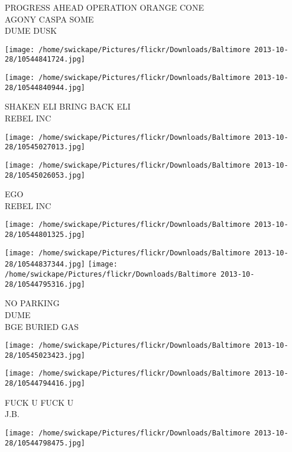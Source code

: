 \documentclass[10pt,letterpaper]{article}
\begin{document}
PROGRESS AHEAD OPERATION ORANGE CONE\\
AGONY CASPA SOME\\
DUME DUSK\\
\pagebreak

\texttt{[image: /home/swickape/Pictures/flickr/Downloads/Baltimore 2013-10-28/10544841724.jpg]}

\vspace{0.25in}
\texttt{[image: /home/swickape/Pictures/flickr/Downloads/Baltimore 2013-10-28/10544840944.jpg]}

SHAKEN ELI BRING BACK ELI\\
REBEL INC\\
\pagebreak

\texttt{[image: /home/swickape/Pictures/flickr/Downloads/Baltimore 2013-10-28/10545027013.jpg]}

\vspace{0.25in}
\texttt{[image: /home/swickape/Pictures/flickr/Downloads/Baltimore 2013-10-28/10545026053.jpg]}

EGO\\
REBEL INC\\
\pagebreak

\texttt{[image: /home/swickape/Pictures/flickr/Downloads/Baltimore 2013-10-28/10544801325.jpg]}

\vspace{0.25in}
\texttt{[image: /home/swickape/Pictures/flickr/Downloads/Baltimore 2013-10-28/10544837344.jpg]}
\texttt{[image: /home/swickape/Pictures/flickr/Downloads/Baltimore 2013-10-28/10544795316.jpg]}

NO PARKING\\
DUME\\
BGE BURIED GAS\\
\pagebreak

\texttt{[image: /home/swickape/Pictures/flickr/Downloads/Baltimore 2013-10-28/10545023423.jpg]}

\vspace{0.25in}
\texttt{[image: /home/swickape/Pictures/flickr/Downloads/Baltimore 2013-10-28/10544794416.jpg]}

FUCK U FUCK U\\
J.B.\\
\pagebreak

\texttt{[image: /home/swickape/Pictures/flickr/Downloads/Baltimore 2013-10-28/10544798475.jpg]}
\end{document}
